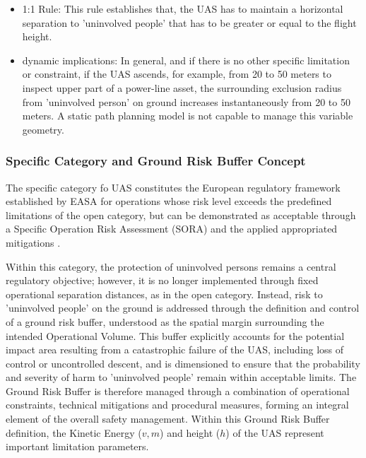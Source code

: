 \documentclass[a4paper, 11pt]{article}
\begin{document}
\begin{itemize}

    \item 1:1 Rule: This rule establishes that, the UAS has to maintain a horizontal separation to 'uninvolved people' that has to be greater or equal to the flight height.

    \item dynamic implications: In general, and if there is no other specific limitation or constraint, if the UAS ascends, for example, from 20 to 50 meters to inspect upper part of a power-line asset, the surrounding exclusion radius from 'uninvolved person' on ground increases instantaneously from 20 to 50 meters. A static path planning model is not capable to manage this variable geometry. 
    
\end{itemize}


\subsubsection{Specific Category and Ground Risk Buffer Concept }
The specific category fo UAS constitutes the European regulatory framework established by EASA for operations whose risk level exceeds the predefined limitations of the open category, but can be demonstrated as acceptable through a Specific Operation Risk Assessment (SORA) and the applied appropriated mitigations \cite{EU2019_947}.

Within this category, the protection of uninvolved persons remains a central regulatory objective; however, it is no longer implemented through fixed operational separation distances, as in the open category. Instead, risk to 'uninvolved people' on the ground is addressed through the definition and control of a ground risk buffer, understood as the spatial margin surrounding the intended Operational Volume. This buffer explicitly accounts for the potential impact area resulting from a catastrophic failure of the UAS, including loss of control or uncontrolled descent, and is dimensioned to ensure that the probability and severity of harm to 'uninvolved people' remain within acceptable limits. The Ground Risk Buffer is therefore managed through a combination of operational constraints, technical mitigations and procedural measures, forming an integral element of the overall safety management. Within this Ground Risk Buffer definition, the Kinetic Energy ($v, m$) and height ($h$) of the UAS represent important limitation parameters. 
\end{document}
